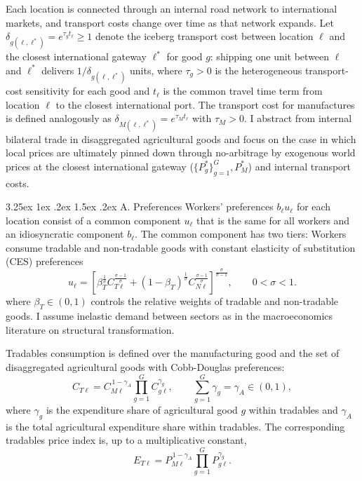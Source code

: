 \documentclass[11pt]{article}
\makeatletter
\renewcommand\paragraph{\@startsection{paragraph}{4}{\z@}%
  {3.25ex \@plus 1ex \@minus .2ex}%
  {1.5ex \@plus .2ex}%
  {\normalfont\normalsize\bfseries}}
\makeatother
\begin{document}
Each location is connected through an internal road network to international markets, and transport costs change over time as that network expands. Let $\delta_{g(\ell,\ell^*)}=e^{\tau_g t_\ell}\geq 1$ denote the iceberg transport cost between location $\ell$ and the closest international gateway $\ell^*$ for good $g$: shipping one unit between $\ell$ and $\ell^*$ delivers $1/\delta_{g(\ell,\ell^*)}$ units, where $\tau_g>0$ is the heterogeneous transport-cost sensitivity for each good and $t_\ell$ is the common travel time term from location $\ell$ to the closest international port. The transport cost for manufactures is defined analogously as $\delta_{M(\ell,\ell^*)}=e^{\tau_M t_\ell}$ with $\tau_M>0$. I abstract from internal bilateral trade in disaggregated agricultural goods and focus on the case in which local prices are ultimately pinned down through no-arbitrage by exogenous world prices at the closest international gateway ($\{P_g^\ast\}_{g=1}^{G}, P_M^\ast$) and internal transport costs.

\paragraph{A. Preferences}
Workers' preferences $b_\ell u_\ell$ for each location consist of a common component $u_\ell$ that is the same for all workers and an idiosyncratic component $b_\ell$. The common component has two tiers: Workers consume tradable and non-tradable goods with constant elasticity of substitution (CES) preferences
\begin{equation}
    u_{\ell} = \left[ \beta_T^{\frac{1}{\sigma}} C_{T\ell}^{\frac{\sigma-1}{\sigma}} + (1 - \beta_T)^{\frac{1}{\sigma}} C_{N\ell}^{\frac{\sigma-1}{\sigma}} \right]^{\frac{\sigma}{\sigma-1}},
    \qquad 0<\sigma<1.
\label{eq:utility}
\end{equation}
where $\beta_T \in (0,1)$ controls the relative weights of tradable and non-tradable goods. I assume inelastic demand between sectors as in the macroeconomics literature on structural transformation. 

Tradables consumption is defined over the manufacturing good and the set of disaggregated agricultural goods with Cobb-Douglas preferences:
\begin{equation}
    C_{T\ell}= C_{M\ell}^{\,1-\gamma_A}\prod_{g=1}^G C_{g\ell}^{\gamma_g},
    \qquad
    \sum_{g=1}^G \gamma_g = \gamma_A \in (0,1),
    \label{eq:tradables_nest}
\end{equation}
where $\gamma_g$ is the expenditure share of agricultural good $g$ within tradables and $\gamma_A$ is the total agricultural expenditure share within tradables. The corresponding tradables price index is, up to a multiplicative constant,
\begin{equation}
        E_{T\ell}= P_{M\ell}^{\,1-\gamma_A}\prod_{g=1}^G P_{g\ell}^{\gamma_g}.
    \label{eq:ET}
\end{equation}
 
\end{document}

